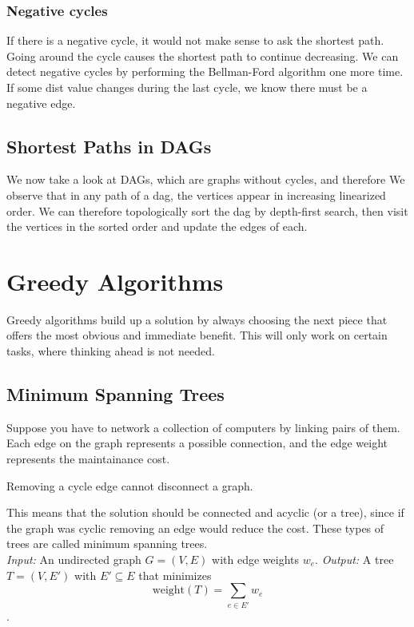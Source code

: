 \subsubsection{Negative cycles}
If there is a negative cycle, it would not make sense to ask the shortest path.
Going around the cycle causes the shortest path to continue decreasing.
We can detect negative cycles by performing the Bellman-Ford algorithm one more time.
If some dist value changes during the last cycle, we know there must be a negative edge.

\subsection{Shortest Paths in DAGs}
We now take a look at DAGs, which are graphs without cycles, and therefore 
We observe that in any path of a dag, the vertices appear in increasing linearized order.
We can therefore topologically sort the dag by depth-first search, then visit the vertices in the sorted order and update the edges of each.

\pagebreak
\section{Greedy Algorithms}
Greedy algorithms build up a solution by always choosing the next piece that offers the most obvious and immediate benefit.
This will only work on certain tasks, where thinking ahead is not needed.

\subsection{Minimum Spanning Trees}
Suppose you have to network a collection of computers by linking pairs of them.
Each edge on the graph represents a possible connection, and the edge weight represents the maintainance cost.
\begin{property}
  Removing a cycle edge cannot disconnect a graph.
\end{property}
This means that the solution should be connected and acyclic (or a tree), since if the graph was cyclic removing an edge would reduce the cost.
These types of trees are called minimum spanning trees. \\
\textit{Input:} An undirected graph $G = (V, E)$ with edge weights $w_e$.
\textit{Output:} A tree $T = (V, E')$ with $E' \subseteq E$ that minimizes $$\text{weight}(T) = \sum_{e \in E'} w_e$$.


